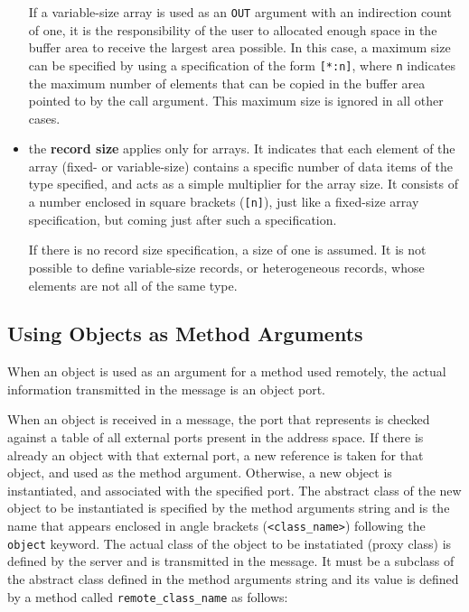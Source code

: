 \begin{itemize}
If a variable-size array is used as an \verb|OUT| argument with an
indirection count of one, it is the responsibility of the user to
allocated enough space in the buffer area to receive the largest area
possible. In this case, a maximum size can be specified by using a
specification of the form \verb|[*:n]|, where \verb|n| indicates the
maximum number of elements that can be copied in the buffer area
pointed to by the call argument. This maximum size is ignored in all
other cases.

\item the {\bf record size} applies only for arrays. It indicates that
each element of the array (fixed- or variable-size) contains a
specific number of data items of the type specified, and acts as a
simple multiplier for the array size. It consists of a number enclosed
in square brackets (\verb|[n]|), just like a fixed-size array
specification, but coming just after such a specification.

If there is no record size specification, a size of one is assumed.
It is not possible to define variable-size records, or heterogeneous
records, whose elements are not all of the same type.

\end{itemize}

\subsection{Using Objects as Method Arguments}

When an object is used as an argument for a method used remotely, the
actual information transmitted in the message is an object port.

When an object is received in a message, the port that represents
is checked against a table of all external ports present in the
address space. If there is already an object with that external port,
a new reference is taken for that object, and used as the method
argument.  Otherwise, a new object is instantiated, and associated
with the specified port. The abstract class of the new object to be
instantiated is specified by the method arguments string and is the
name that appears enclosed in angle brackets (\verb|<class_name>|)
following the \verb|object| keyword. The actual class of the object to
be instatiated (proxy class) is defined by the server and is
transmitted in the message. It must be a subclass of the abstract
class defined in the method arguments string and its value is defined
by a method called {\tt remote\_class\_name} as follows:

